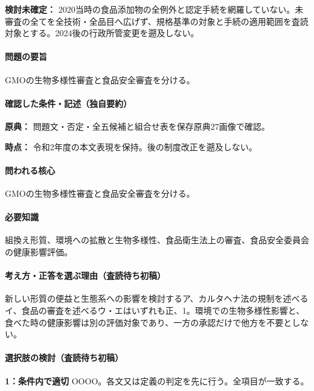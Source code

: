 \par\textbf{検討未確定：} 2020当時の食品添加物の全例外と認定手続を網羅していない。未審査の全てを全技術・全品目へ広げず、規格基準の対象と手続の適用範囲を査読対象とする。2024後の行政所管変更を遡及しない。

\paragraph{問題の要旨} GMOの生物多様性審査と食品安全審査を分ける。

\paragraph{確認した条件・記述（独自要約）}\mbox{}\par

\noindent\textbf{原典：} 問題文・否定・全五候補と組合せ表を保存原典27画像で確認。\par

\noindent\textbf{時点：} 令和2年度の本文表現を保持。後の制度改正を遡及しない。\par

\paragraph{問われる核心} GMOの生物多様性審査と食品安全審査を分ける。

\paragraph{必要知識} 組換え形質、環境への拡散と生物多様性、食品衛生法上の審査、食品安全委員会の健康影響評価。

\paragraph{考え方・正答を選ぶ理由（査読待ち初稿）} 新しい形質の便益と生態系への影響を検討するア、カルタヘナ法の規制を述べるイ、食品の審査を述べるウ・エはいずれも正、1。環境での生物多様性影響と、食べた時の健康影響は別の評価対象であり、一方の承認だけで他方を不要としない。

\paragraph{選択肢の検討（査読待ち初稿）}\mbox{}\par

\noindent\textbf{1：条件内で適切} OOOO。各文又は定義の判定を先に行う。全項目が一致する。\par

